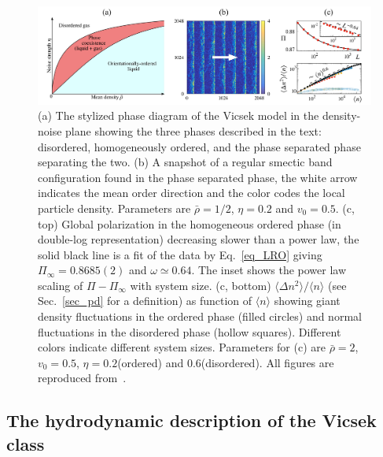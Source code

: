 \begin{figure}[t!]
	\includegraphics[width=\textwidth]{Figures/figVM.pdf}
	\caption{(a) The stylized phase diagram of the Vicsek model in the density-noise plane showing the three phases described in the text: disordered, homogeneously ordered, and the phase separated phase separating the two.
	(b) A snapshot of a regular smectic band configuration found in the phase separated phase, the white arrow indicates the mean order direction and the color codes the local particle density. 
	Parameters are $\bar{\rho} = 1/2$, $\eta = 0.2$ and $v_0 = 0.5$.
	(c, top) Global polarization in the homogeneous ordered phase (in double-log representation) decreasing slower than a power law, the solid black line is a fit of the data by Eq.~\eqref{eq_LRO} giving $\Pi_\infty = 0.8685(2)$ and $\omega \simeq 0.64$. The inset shows the power law scaling of $\Pi - \Pi_\infty$ with system size.
	(c, bottom) $\langle \Delta n^2 \rangle/\langle n \rangle$ (see Sec.~\ref{sec_pd} for a definition) as function of $\langle n \rangle$ showing giant density fluctuations in the ordered phase (filled circles) and normal fluctuations in the disordered phase (hollow squares). Different colors indicate different system sizes.
	Parameters for (c) are $\bar{\rho} = 2$, $v_0 = 0.5$, $\eta = 0.2$(ordered) and 0.6(disordered).
	All figures are reproduced from~\cite{DADAM_LesHouches}. 
	}
	\label{figVM}
\end{figure}

\subsection{The hydrodynamic description of the Vicsek class}

